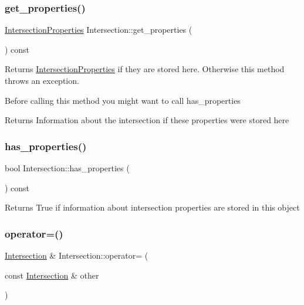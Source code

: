 \subsubsection{\texorpdfstring{get\_properties()}{get\_properties()}}
{\footnotesize\ttfamily \mbox{\hyperlink{classIntersectionProperties}{Intersection\+Properties}} Intersection\+::get\+\_\+properties (\begin{DoxyParamCaption}{ }\end{DoxyParamCaption}) const}



Returns \mbox{\hyperlink{classIntersectionProperties}{Intersection\+Properties}} if they are stored here. Otherwise this method throws an exception. 

Before calling this method you might want to call has\+\_\+properties \begin{DoxyReturn}{Returns}
Information about the intersection if these properties were stored here 
\end{DoxyReturn}
\mbox{\label{classIntersection_a8d3d1d7310df69a465489b0e4141cb47}} 
\subsubsection{\texorpdfstring{has\_properties()}{has\_properties()}}
{\footnotesize\ttfamily bool Intersection\+::has\+\_\+properties (\begin{DoxyParamCaption}{ }\end{DoxyParamCaption}) const}

\begin{DoxyReturn}{Returns}
True if information about intersection properties are stored in this object 
\end{DoxyReturn}
\mbox{\label{classIntersection_add5b6d995062799bd840c6486790c604}} 
\subsubsection{\texorpdfstring{operator=()}{operator=()}}
{\footnotesize\ttfamily \mbox{\hyperlink{classIntersection}{Intersection}} \& Intersection\+::operator= (\begin{DoxyParamCaption}\item[{const \mbox{\hyperlink{classIntersection}{Intersection}} \&}]{other }\end{DoxyParamCaption})}

